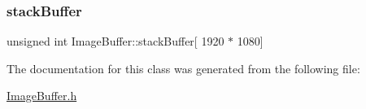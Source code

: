 \mbox{\label{structImageBuffer_a36f4b5945877816b613e13100d8954c5}} 
\subsubsection{\texorpdfstring{stack\+Buffer}{stackBuffer}}
{\footnotesize\ttfamily unsigned int Image\+Buffer\+::stack\+Buffer\mbox{[} 1920 $\ast$ 1080\mbox{]}}



The documentation for this class was generated from the following file\+:\begin{DoxyCompactItemize}
\item 
\hyperlink{ImageBuffer_8h}{Image\+Buffer.\+h}\end{DoxyCompactItemize}

